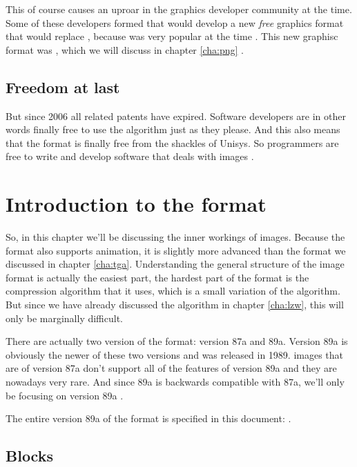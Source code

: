 \begin{refsection}
  This of course causes an uproar in the graphics developer community
  at the time. Some of these developers formed that would develop a new
  \textit{free} graphics format that would replace \gif, because
  \gif was very popular at the time
  . This
  new graphisc format was \png, which we will discuss in chapter
  \ref{cha:png} \cite{roelofs09:_histor_portab_networ_graph_png_format,caie:_sad}.

  \subsection{Freedom at last}

  But since 2006 all \lzw related patents have expired. Software
  developers are in other words finally free to use the \lzw algorithm
  just as they please. And this also means that the \gif format is
  finally free from the shackles of Unisys. So programmers are free to
  write and develop software that deals with \gif images \cite{caie:_sad}.

  \section{Introduction to the \gif format}

  So, in this chapter we'll be discussing the inner workings of \gif
  images. Because the \gif format also supports animation, it is
  slightly more advanced than the \tga format we discussed in chapter
  \ref{cha:tga}. Understanding the general structure of the image
  format is actually the easiest part, the hardest part of the format
  is the compression algorithm that it uses, which is a small
  variation of the \lzw algorithm. But since we have already discussed the \lzw
  algorithm in chapter \ref{cha:lzw}, this will only be marginally
  difficult.

  There are actually two version of the \gif format: version 87a and
  89a. Version 89a is obviously the newer of these two versions and
  was released in 1989. \gif images that are of version 87a don't
  support all of the features of version 89a and they are nowadays
  very rare. And since 89a is backwards compatible with 87a, we'll
  only be focusing on version 89a \cite{gif89a,gif87a}.

  The entire version 89a of the \gif format is specified in this
  document: \cite{gif89a}.


  \subsection{\gif  Blocks}


\end{refsection}
